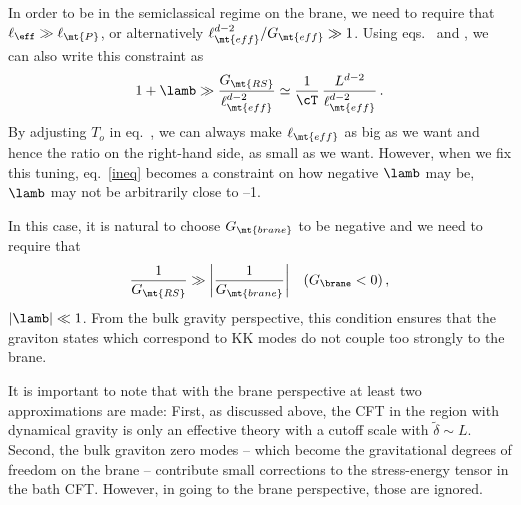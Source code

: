 In order to be in the semiclassical regime on the brane, we need to require that $\ell_\eff\gg \ell_\mt{P}$, or alternatively $\ell_\mt{eff}^{d-2}/G_\mt{eff}\gg 1$. 
Using eqs.~ and , we can also write this constraint as
\begin{align}\label{ineq}
1+\lamb\gg\frac{G_\mt{RS}}{\ell_\mt{eff}^{d-2}}\simeq\frac{1}{\cT}\,\frac{L^{d-2}}{\ell_\mt{eff}^{d-2}}\,.
\end{align}
By adjusting $T_o$ in eq.~, we can always make $\ell_\mt{eff}$ as big as we want and hence the ratio on the right-hand side, as small as we want. However, when we fix this tuning, eq.~\eqref{ineq} becomes a constraint on how negative $\lamb$ may be, \ie $\lamb$ may not be arbitrarily close to --1. 

 In this case, it is natural to choose $G_\mt{brane}$ to be negative and we need to require that
\begin{align}
\frac 1 {G_\mt{RS}} \gg \left| \frac 1 {G_\mt{brane}} \right| && (G_\brane  < 0)\,,
\end{align}
\ie $|\lamb|\ll 1$. 
From the bulk gravity perspective, this condition ensures that the graviton states which correspond to KK modes do not couple too strongly to the brane.  




It is important to note that with the brane perspective at least two approximations are made: First, as discussed above, the CFT in the region with dynamical gravity is only an effective theory with a cutoff scale with $\tilde\delta\sim L$. Second, the bulk graviton zero modes -- which become the gravitational degrees of freedom on the brane -- contribute small corrections to the stress-energy tensor in the bath CFT. However, in going to the brane perspective, those are ignored.

